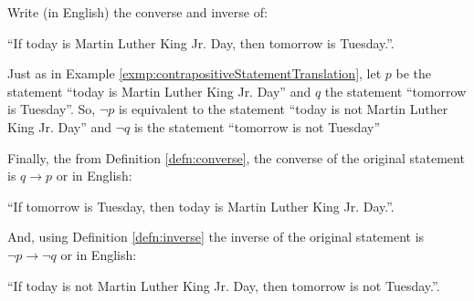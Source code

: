 \guard






\begin{exmp}
\label{exmp:converseInverseStatementTranslation}
  Write (in English) the converse and inverse of:
  \begin{center}
      ``If today is Martin Luther King Jr. Day, then tomorrow is Tuesday.''.
  \end{center}

  Just as in Example \ref{exmp:contrapositiveStatementTranslation}, let $p$ be the statement ``today is Martin Luther King Jr. Day'' and $q$ the statement ``tomorrow is Tuesday''.
  So, $\neg p$ is equivalent to the statement ``today is not Martin Luther King Jr. Day'' and $\neg q$ is the statement ``tomorrow is not Tuesday''

  Finally, the from Definition \ref{defn:converse}, the converse of the original statement is $q \rightarrow p$ or in English:
  \begin{center}
      ``If tomorrow is Tuesday, then today is Martin Luther King Jr. Day.''.
  \end{center}
  And, using Definition \ref{defn:inverse} the inverse of the original statement is $\neg p \rightarrow \neg q$ or in English:
  \begin{center}
      ``If today is not Martin Luther King Jr. Day, then tomorrow is not Tuesday.''.
  \end{center}
\end{exmp}
